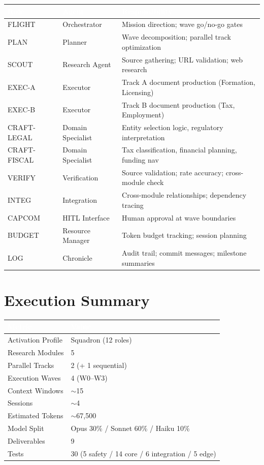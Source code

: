 \documentclass[11pt,letterpaper]{article}
\newcommand{\tableheader}[1]{\textbf{\sffamily\textcolor{white}{#1}}}
\begin{document}
\begin{center}
\begin{tabularx}{\textwidth}{L{2.5cm}L{2.5cm}X}
\toprule
{}
\tableheader{Role} & \tableheader{Agent} & \tableheader{Responsibility} \\
\midrule
FLIGHT & Orchestrator & Mission direction; wave go/no-go gates \\
PLAN & Planner & Wave decomposition; parallel track optimization \\
SCOUT & Research Agent & Source gathering; URL validation; web research \\
EXEC-A & Executor & Track A document production (Formation, Licensing) \\
EXEC-B & Executor & Track B document production (Tax, Employment) \\
CRAFT-LEGAL & Domain Specialist & Entity selection logic, regulatory interpretation \\
CRAFT-FISCAL & Domain Specialist & Tax classification, financial planning, funding nav \\
VERIFY & Verification & Source validation; rate accuracy; cross-module check \\
INTEG & Integration & Cross-module relationships; dependency tracing \\
CAPCOM & HITL Interface & Human approval at wave boundaries \\
BUDGET & Resource Manager & Token budget tracking; session planning \\
LOG & Chronicle & Audit trail; commit messages; milestone summaries \\
\bottomrule
\end{tabularx}
\end{center}

\section{Execution Summary}

\begin{center}
\begin{tabularx}{\textwidth}{L{5cm}X}
\toprule
{}
\tableheader{Metric} & \tableheader{Value} \\
\midrule
Activation Profile & Squadron (12 roles) \\
Research Modules & 5 \\
Parallel Tracks & 2 (+ 1 sequential) \\
Execution Waves & 4 (W0--W3) \\
Context Windows & $\sim$15 \\
Sessions & $\sim$4 \\
Estimated Tokens & $\sim$67,500 \\
Model Split & Opus 30\% / Sonnet 60\% / Haiku 10\% \\
Deliverables & 9 \\
Tests & 30 (5 safety / 14 core / 6 integration / 5 edge) \\
\bottomrule
\end{tabularx}
\end{center}
\end{document}
